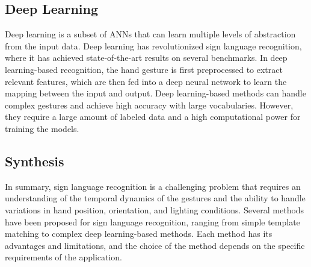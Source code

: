 \subsection{Deep Learning}
Deep learning is a subset of ANNs that can learn multiple levels of abstraction from the input data. Deep learning has revolutionized sign language recognition, where it has achieved state-of-the-art results on several benchmarks. In deep learning-based recognition, the hand gesture is first preprocessed to extract relevant features, which are then fed into a deep neural network to learn the mapping between the input and output. Deep learning-based methods can handle complex gestures and achieve high accuracy with large vocabularies. However, they require a large amount of labeled data and a high computational power for training the models.

\subsection{Synthesis}
In summary, sign language recognition is a challenging problem that requires an understanding of the temporal dynamics of the gestures and the ability to handle variations in hand position, orientation, and lighting conditions. Several methods have been proposed for sign language recognition, ranging from simple template matching to complex deep learning-based methods. Each method has its advantages and limitations, and the choice of the method depends on the specific requirements of the application.